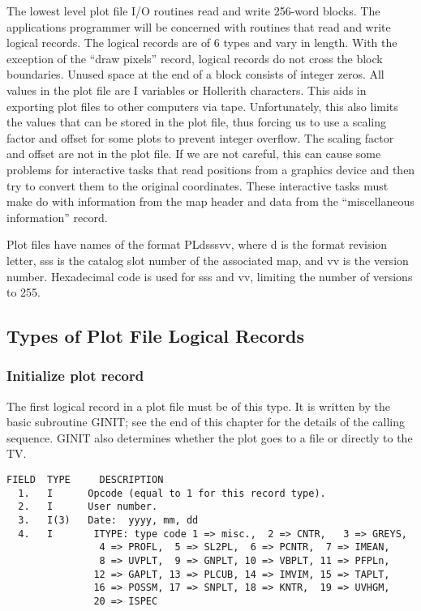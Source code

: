 The lowest level plot file I/O routines read and write 256-word
blocks.  The applications programmer will be concerned with routines
that read and write logical records. The logical records are of 6
types and vary in length.  With the exception of the ``draw pixels''
record, logical records do not cross the block boundaries.   Unused
space at the end of a block consists of integer zeros.  All values in
the plot file are I variables or Hollerith characters.  This aids in
exporting plot files to other computers via tape.  Unfortunately, this
also limits the values that can be stored in the plot file, thus
forcing us to use a scaling factor and offset for some plots to
prevent integer overflow.  The scaling factor and offset are not in
the plot file.  If we are not careful, this can cause some problems
for interactive tasks that read positions from a graphics device and
then try to convert them to the original coordinates.  These
interactive tasks must make do with information from the map header
and data from the ``miscellaneous information'' record.

Plot files have names of the format PLdsssvv, where d is the format
revision letter, sss is the catalog slot number of the associated map,
and vv is the version number.  Hexadecimal code is used for sss and
vv, limiting the number of versions to 255.

\subsection{Types of Plot File Logical Records}
\subsubsection{Initialize plot record}
The first logical record in a plot file must be of this type. It is
written by the basic subroutine GINIT; see the end of
this chapter for the details of the calling sequence.  GINIT also
determines whether the plot goes to a file or directly to the TV.

\begin{verbatim}
FIELD  TYPE     DESCRIPTION
  1.   I      Opcode (equal to 1 for this record type).
  2.   I      User number.
  3.   I(3)   Date:  yyyy, mm, dd
  4.   I       ITYPE: type code 1 => misc.,  2 => CNTR,   3 => GREYS,
                4 => PROFL,  5 => SL2PL,  6 => PCNTR,  7 => IMEAN,
                8 => UVPLT,  9 => GNPLT, 10 => VBPLT, 11 => PFPLn,
               12 => GAPLT, 13 => PLCUB, 14 => IMVIM, 15 => TAPLT,
               16 => POSSM, 17 => SNPLT, 18 => KNTR,  19 => UVHGM,
               20 => ISPEC

\end{verbatim}
